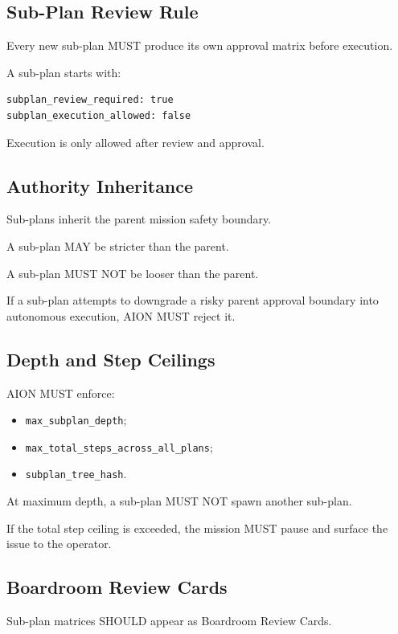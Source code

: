 \subsection{Sub-Plan Review Rule}

Every new sub-plan MUST produce its own approval matrix before execution.

A sub-plan starts with:

\begin{verbatim}
subplan_review_required: true
subplan_execution_allowed: false
\end{verbatim}

Execution is only allowed after review and approval.

\subsection{Authority Inheritance}

Sub-plans inherit the parent mission safety boundary.

A sub-plan MAY be stricter than the parent.

A sub-plan MUST NOT be looser than the parent.

If a sub-plan attempts to downgrade a risky parent approval boundary into autonomous execution, AION MUST reject it.

\subsection{Depth and Step Ceilings}

AION MUST enforce:

\begin{itemize}
  \item \texttt{max\_subplan\_depth};
  \item \texttt{max\_total\_steps\_across\_all\_plans};
  \item \texttt{subplan\_tree\_hash}.
\end{itemize}

At maximum depth, a sub-plan MUST NOT spawn another sub-plan.

If the total step ceiling is exceeded, the mission MUST pause and surface the issue to the operator.

\subsection{Boardroom Review Cards}

Sub-plan matrices SHOULD appear as Boardroom Review Cards.

